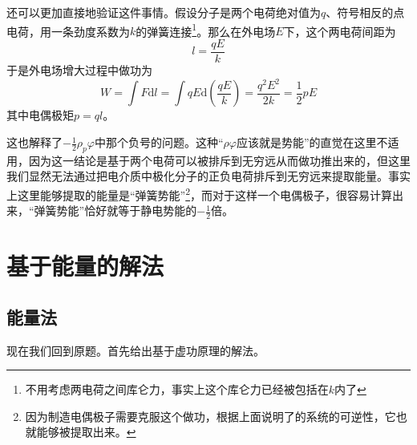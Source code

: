 \documentclass{ctexart}
\begin{document}
	还可以更加直接地验证这件事情。假设分子是两个电荷绝对值为$q$、符号相反的点电荷，用一条劲度系数为$k$的弹簧连接\footnote{不用考虑两电荷之间库仑力，事实上这个库仑力已经被包括在$k$内了}。那么在外电场$E$下，这个两电荷间距为
	\begin{equation}
	l=\frac{qE}{k}
	\end{equation}
	于是外电场增大过程中做功为
	\begin{equation}
	W=\int F\mathrm dl=\int qE\mathrm d\left(\frac{qE}{k}\right)=\frac{q^2E^2}{2k}=\frac{1}{2}pE
	\end{equation}
	其中电偶极矩$p=ql$。
	
	这也解释了$-\frac{1}{2}\rho_p\varphi$中那个负号的问题。这种“$\rho\varphi$应该就是势能”的直觉在这里不适用，因为这一结论是基于两个电荷可以被排斥到无穷远从而做功推出来的，但这里我们显然无法通过把电介质中极化分子的正负电荷排斥到无穷远来提取能量。事实上这里能够提取的能量是“弹簧势能”\footnote{因为制造电偶极子需要克服这个做功，根据上面说明了的系统的可逆性，它也就能够被提取出来。}，而对于这样一个电偶极子，很容易计算出来，“弹簧势能”恰好就等于静电势能的$-\frac{1}{2}$倍。
	
	
	
	
	\section{基于能量的解法}
	
	\subsection{能量法}
	
	现在我们回到原题。首先给出基于虚功原理的解法。
	
\end{document}
